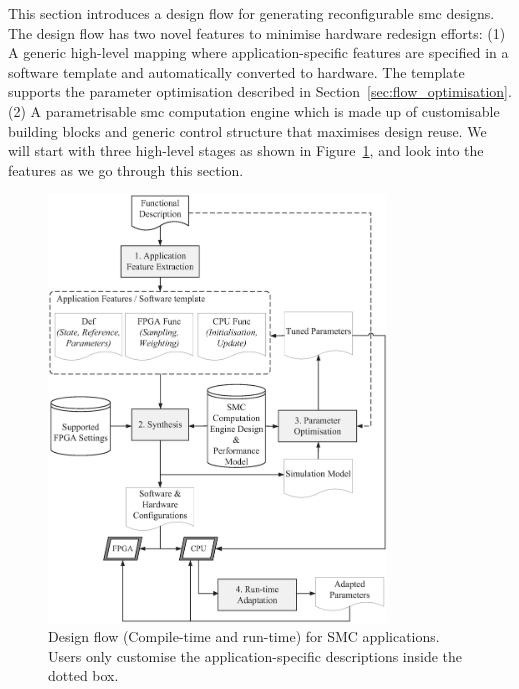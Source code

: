 This section introduces a design flow for generating reconfigurable \gls{smc} 
designs. The design flow has two novel features to minimise hardware redesign efforts:
(1) A generic high-level mapping where application-specific features are specified in a software template and automatically converted to hardware.
The template supports the parameter optimisation described in Section~\ref{sec:flow_optimisation}.
(2) A parametrisable \gls{smc} computation engine which is made up of customisable building blocks and generic control structure that maximises design reuse.
We will start with three high-level stages as shown in Figure~\ref{fig:flow}, and look into the features as we go through this section.

\begin{figure}[ht]
\begin{center}
\includegraphics[width=0.8\textwidth]{5_tool/figures/flow}
\end{center}
\caption{Design flow (Compile-time and run-time) for SMC applications. Users only customise the application-specific descriptions inside the dotted box.}
\label{fig:flow}
\end{figure}

